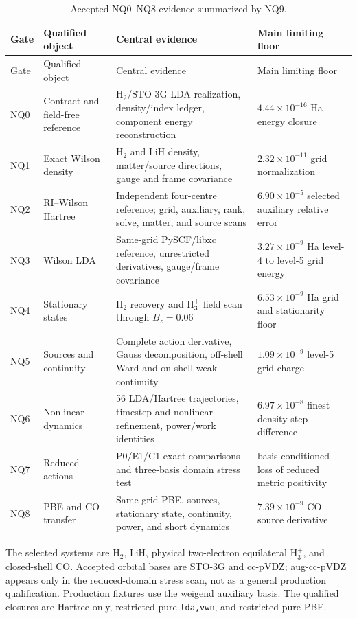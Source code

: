 \documentclass[11pt]{article}
\begin{document}
\begin{longtable}{p{}p{}p{}p{}}
\caption{Accepted NQ0--NQ8 evidence summarized by NQ9.}\label{tab:gates}\\
\toprule
Gate & Qualified object & Central evidence & Main limiting floor\\
\midrule
\endfirsthead
\toprule
Gate & Qualified object & Central evidence & Main limiting floor\\
\midrule
\endhead
NQ0 & Contract and field-free reference & H$_2$/STO-3G LDA realization, density/index ledger, component energy reconstruction & $4.44\times10^{-16}$ Ha energy closure\\
NQ1 & Exact Wilson density & H$_2$ and LiH density, matter/source directions, gauge and frame covariance & $2.32\times10^{-11}$ grid normalization\\
NQ2 & RI--Wilson Hartree & Independent four-centre reference; grid, auxiliary, rank, solve, matter, and source scans & $6.90\times10^{-5}$ selected auxiliary relative error\\
NQ3 & Wilson LDA & Same-grid PySCF/libxc reference, unrestricted derivatives, gauge/frame covariance & $3.27\times10^{-9}$ Ha level-4 to level-5 grid energy\\
NQ4 & Stationary states & H$_2$ recovery and H$_3^+$ field scan through $B_z=0.06$ & $6.53\times10^{-9}$ Ha grid and stationarity floor\\
NQ5 & Sources and continuity & Complete action derivative, Gauss decomposition, off-shell Ward and on-shell weak continuity & $1.09\times10^{-9}$ level-5 grid charge\\
NQ6 & Nonlinear dynamics & 56 LDA/Hartree trajectories, timestep and nonlinear refinement, power/work identities & $6.97\times10^{-8}$ finest density step difference\\
NQ7 & Reduced actions & P0/E1/C1 exact comparisons and three-basis domain stress test & basis-conditioned loss of reduced metric positivity\\
NQ8 & PBE and CO transfer & Same-grid PBE, sources, stationary state, continuity, power, and short dynamics & $7.39\times10^{-9}$ CO source derivative\\
\bottomrule
\end{longtable}

The selected systems are H$_2$, LiH, physical two-electron equilateral
H$_3^+$, and closed-shell CO.  Accepted orbital bases are STO-3G and
cc-pVDZ; aug-cc-pVDZ appears only in the reduced-domain stress scan, not as a
general production qualification.  Production fixtures use the weigend
auxiliary basis.  The qualified closures are Hartree only, restricted pure
\texttt{lda,vwn}, and restricted pure PBE.
\end{document}
